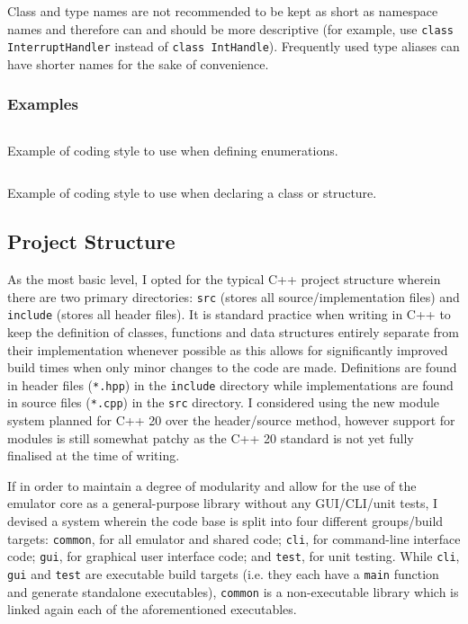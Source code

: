         Class and type names are not recommended to be kept as short as namespace names and therefore can and should be more descriptive (for example, use \texttt{class InterruptHandler} instead of \texttt{class IntHandle}). Frequently used type aliases can have shorter names for the sake of convenience.

    \subsubsection{Examples}
        \begin{listing}[h]
            \inputminted{c++}{code/enum.cpp}
            \caption{Example of coding style to use when defining enumerations.}
            \label{lst:enum-example}
        \end{listing}

        \begin{listing}[h]
            \inputminted{c++}{code/class.hpp}
            \caption{Example of coding style to use when declaring a class or structure.}
            \label{lst:class-example}
        \end{listing}

\subsection{Project Structure}
    \label{sec:project-structure}
    As the most basic level, I opted for the typical C++ project structure wherein there are two primary directories: \texttt{src} (stores all source/implementation files) and \texttt{include} (stores all header files). It is standard practice when writing in C++ to keep the definition of classes, functions and data structures entirely separate from their implementation whenever possible as this allows for significantly improved build times when only minor changes to the code are made. Definitions are found in header files (\texttt{*.hpp}) in the \texttt{include} directory while implementations are found in source files (\texttt{*.cpp}) in the \texttt{src} directory. I considered using the new module system planned for C++ 20 over the header/source method, however support for modules is still somewhat patchy as the C++ 20 standard is not yet fully finalised at the time of writing.

    If in order to maintain a degree of modularity and allow for the use of the emulator core as a general-purpose library without any GUI/CLI/unit tests, I devised a system wherein the code base is split into four different groups/build targets: \texttt{common}, for all emulator and shared code; \texttt{cli}, for command-line interface code; \texttt{gui}, for graphical user interface code; and \texttt{test}, for unit testing. While \texttt{cli}, \texttt{gui} and \texttt{test} are executable build targets (i.e. they each have a \texttt{main} function and generate standalone executables), \texttt{common} is a non-executable library which is linked again each of the aforementioned executables.

